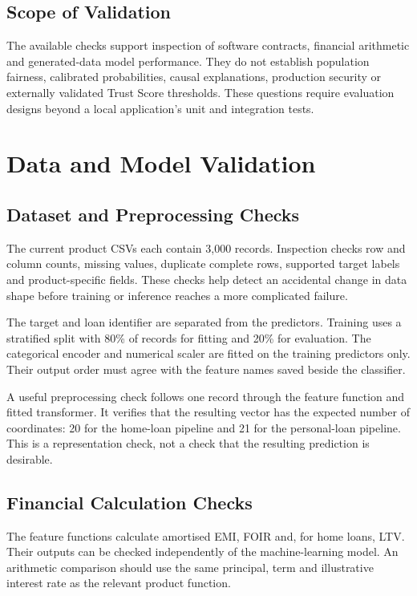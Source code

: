 \subsection{Scope of Validation}
The available checks support inspection of software contracts, financial arithmetic and generated-data model performance. They do not establish population fairness, calibrated probabilities, causal explanations, production security or externally validated Trust Score thresholds. These questions require evaluation designs beyond a local application's unit and integration tests.

\section{Data and Model Validation}
\subsection{Dataset and Preprocessing Checks}
The current product CSVs each contain 3,000 records. Inspection checks row and column counts, missing values, duplicate complete rows, supported target labels and product-specific fields. These checks help detect an accidental change in data shape before training or inference reaches a more complicated failure.

The target and loan identifier are separated from the predictors. Training uses a stratified split with 80\% of records for fitting and 20\% for evaluation. The categorical encoder and numerical scaler are fitted on the training predictors only. Their output order must agree with the feature names saved beside the classifier.

A useful preprocessing check follows one record through the feature function and fitted transformer. It verifies that the resulting vector has the expected number of coordinates: 20 for the home-loan pipeline and 21 for the personal-loan pipeline. This is a representation check, not a check that the resulting prediction is desirable.

\subsection{Financial Calculation Checks}
The feature functions calculate amortised EMI, FOIR and, for home loans, LTV. Their outputs can be checked independently of the machine-learning model. An arithmetic comparison should use the same principal, term and illustrative interest rate as the relevant product function.

